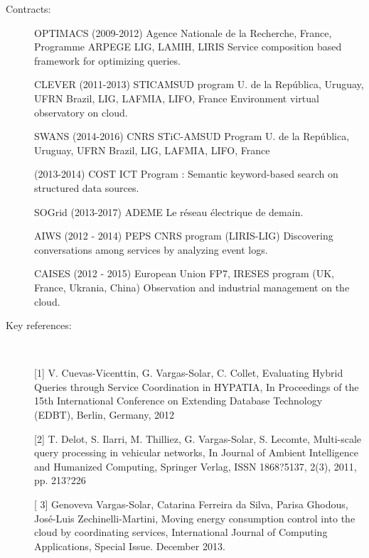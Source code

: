 \begin{description}

\item[Contracts:] 
OPTIMACS (2009-2012)	Agence Nationale de la Recherche, France, Programme ARPEGE LIG, LAMIH, LIRIS Service composition based framework for optimizing queries. 

CLEVER (2011-2013) STICAMSUD program  U. de la Rep{\'u}blica, Uruguay, UFRN Brazil, LIG, LAFMIA, LIFO, France
Environment virtual observatory on cloud. 

SWANS (2014-2016)	CNRS STiC-AMSUD Program U. de la Rep{\'u}blica, Uruguay, UFRN Brazil, LIG, LAFMIA, LIFO, France

(2013-2014)	COST ICT Program : Semantic keyword-based search on structured data sources. 

SOGrid (2013-2017)	ADEME Le r{\'e}seau {\'e}lectrique de demain. 


AIWS (2012 - 2014)	PEPS  CNRS program (LIRIS-LIG) Discovering conversations among services by analyzing event logs.

CAISES (2012 - 2015)	European Union FP7, IRESES program (UK, France, Ukrania, China) Observation and industrial management on the cloud.  

  
\item[Key references:]~%


[1] V. Cuevas-Vicenttin, G.  Vargas-Solar, C. Collet, Evaluating Hybrid Queries through Service Coordination in HYPATIA, In Proceedings of the 15th International Conference on Extending Database Technology (EDBT), Berlin, Germany, 2012

[2] T. Delot, S. Ilarri, M. Thilliez, G.  Vargas-Solar, S. Lecomte, Multi-scale query processing in vehicular networks, In Journal of Ambient Intelligence and Humanized Computing, Springer Verlag, ISSN 1868?5137, 2(3), 2011, pp. 213?226

[ 3]	Genoveva Vargas-Solar, Catarina Ferreira da Silva, Parisa Ghodous, Jos{\'e}-Luis Zechinelli-Martini, Moving energy consumption control into the cloud by coordinating services, International Journal of Computing Applications, Special Issue. December 2013.


\end{description}
